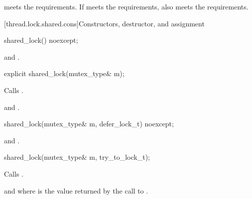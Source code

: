 \pnum
\begin{note}
 meets the 
requirements.
If  meets the 
requirements,
 also meets the 
requirements.
\end{note}

[thread.lock.shared.cons]{Constructors, destructor, and assignment}

%
\begin{itemdecl}
shared_lock() noexcept;
\end{itemdecl}

\begin{itemdescr}
\pnum
\ensures
{} and .
\end{itemdescr}

%
\begin{itemdecl}
explicit shared_lock(mutex_type& m);
\end{itemdecl}

\begin{itemdescr}
\pnum
\effects
Calls .

\pnum
\ensures
{} and .
\end{itemdescr}

%
\begin{itemdecl}
shared_lock(mutex_type& m, defer_lock_t) noexcept;
\end{itemdecl}

\begin{itemdescr}
\pnum
\ensures
{} and .
\end{itemdescr}

%
\begin{itemdecl}
shared_lock(mutex_type& m, try_to_lock_t);
\end{itemdecl}

\begin{itemdescr}
\pnum
\effects
Calls .

\pnum
\ensures
{} and 
where  is the
value returned by the call to .
\end{itemdescr}

